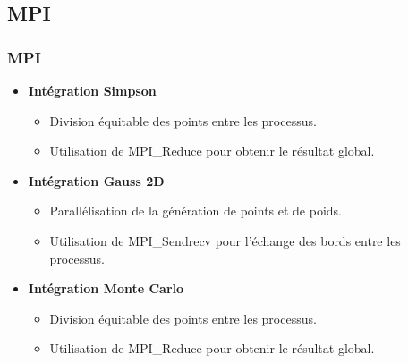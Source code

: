 \documentclass[10pt]{beamer}
\begin{document}
\subsection{MPI}
\begin{frame}
    \frametitle{MPI}
    \small
    \begin{itemize}
        \item \textbf{Intégration Simpson}
            \begin{itemize}
                \item Division équitable des points entre les processus.
                \item Utilisation de MPI\_Reduce pour obtenir le résultat global.
            \end{itemize}
        \item \textbf{Intégration Gauss 2D}
            \begin{itemize}
                \item Parallélisation de la génération de points et de poids.
                \item Utilisation de MPI\_Sendrecv pour l'échange des bords entre les processus.
            \end{itemize}
        \item \textbf{Intégration Monte Carlo }
            \begin{itemize}
                \item Division équitable des points entre les processus.
                \item Utilisation de MPI\_Reduce pour obtenir le résultat global.
            \end{itemize}
    \end{itemize}
\end{frame}


  
  
\end{document}
